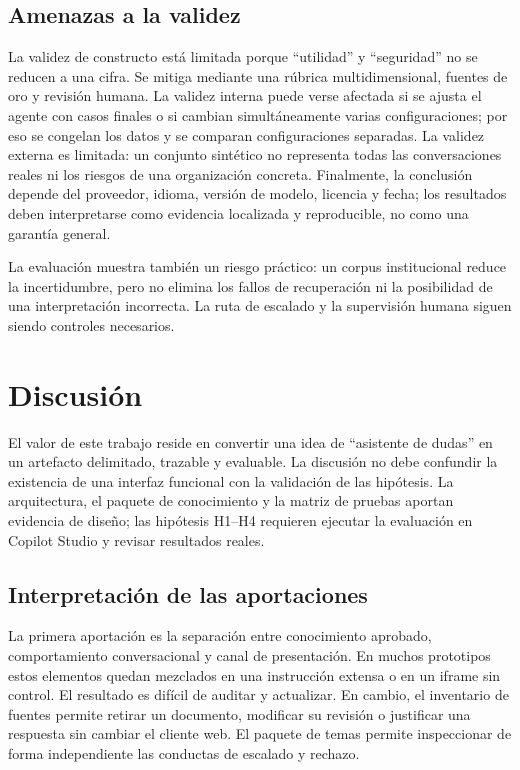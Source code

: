 \documentclass[12pt,twoside,titlepage]{book}
\begin{document}
\section{Amenazas a la validez}

La validez de constructo est\'a limitada porque ``utilidad'' y ``seguridad'' no se reducen a una cifra. Se mitiga mediante una r\'ubrica multidimensional, fuentes de oro y revisi\'on humana. La validez interna puede verse afectada si se ajusta el agente con casos finales o si cambian simult\'aneamente varias configuraciones; por eso se congelan los datos y se comparan configuraciones separadas. La validez externa es limitada: un conjunto sint\'etico no representa todas las conversaciones reales ni los riesgos de una organizaci\'on concreta. Finalmente, la conclusi\'on depende del proveedor, idioma, versi\'on de modelo, licencia y fecha; los resultados deben interpretarse como evidencia localizada y reproducible, no como una garant\'ia general.

La evaluaci\'on muestra tambi\'en un riesgo pr\'actico: un corpus institucional reduce la incertidumbre, pero no elimina los fallos de recuperaci\'on ni la posibilidad de una interpretaci\'on incorrecta. La ruta de escalado y la supervisi\'on humana siguen siendo controles necesarios.



\chapter{Discusi\'on}
\label{chap:discusion}

El valor de este trabajo reside en convertir una idea de ``asistente de dudas'' en un artefacto delimitado, trazable y evaluable. La discusi\'on no debe confundir la existencia de una interfaz funcional con la validaci\'on de las hip\'otesis. La arquitectura, el paquete de conocimiento y la matriz de pruebas aportan evidencia de dise\~no; las hip\'otesis H1--H4 requieren ejecutar la evaluaci\'on en Copilot Studio y revisar resultados reales.

\section{Interpretaci\'on de las aportaciones}

La primera aportaci\'on es la separaci\'on entre conocimiento aprobado, comportamiento conversacional y canal de presentaci\'on. En muchos prototipos estos elementos quedan mezclados en una instrucci\'on extensa o en un iframe sin control. El resultado es dif\'icil de auditar y actualizar. En cambio, el inventario de fuentes permite retirar un documento, modificar su revisi\'on o justificar una respuesta sin cambiar el cliente web. El paquete de temas permite inspeccionar de forma independiente las conductas de escalado y rechazo.
\end{document}
